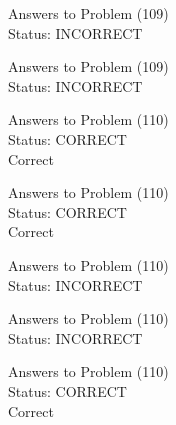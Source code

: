 \documentclass[11pt]{article}
\begin{document}
\begin{minipage}[t]{0.5\textwidth}
  {\centering
  
  Answers to Problem (109)\\
  Status: INCORRECT\\
  
  }
\end{minipage}
\begin{minipage}[t]{0.5\textwidth}
  {\centering
  
  Answers to Problem (109)\\
  Status: INCORRECT\\
  
  }
\end{minipage}
\begin{minipage}[t]{0.5\textwidth}
  {\centering
  
  Answers to Problem (110)\\
  Status: CORRECT\\
  Correct\\
  }
\end{minipage}
\begin{minipage}[t]{0.5\textwidth}
  {\centering
  
  Answers to Problem (110)\\
  Status: CORRECT\\
  Correct\\
  }
\end{minipage}
\begin{minipage}[t]{0.5\textwidth}
  {\centering
  
  Answers to Problem (110)\\
  Status: INCORRECT\\
  
  }
\end{minipage}
\begin{minipage}[t]{0.5\textwidth}
  {\centering
  
  Answers to Problem (110)\\
  Status: INCORRECT\\
  
  }
\end{minipage}
\begin{minipage}[t]{0.5\textwidth}
  {\centering
  
  Answers to Problem (110)\\
  Status: CORRECT\\
  Correct\\
  }
\end{minipage}
\end{document}
